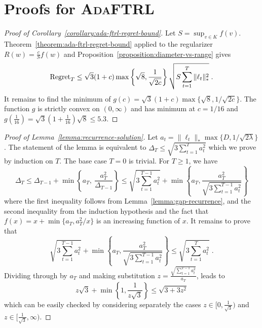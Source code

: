 \section{Proofs for \textsc{AdaFTRL}}
\label{section:ada-ftrl-proofs}

\begin{proof}[Proof of Corollary~\ref{corollary:ada-ftrl-regret-bound}]
Let $S = \sup_{v \in K} f(v)$. Theorem~\ref{theorem:ada-ftrl-regret-bound}
applied to the regularizer $R(w) = \frac{c}{S} f(w)$ and
Proposition~\ref{proposition:diameter-vs-range} gives
$$
\operatorname{Regret}_T \le \sqrt{3}(1 + c) \max\left\{\sqrt{8}, \frac{1}{\sqrt{2c}} \right\} \sqrt{S \sum_{t=1}^T \|\ell_t\|_*^2} \; .
$$
It remains to find the minimum of $g(c) = \sqrt{3}(1 + c) \max\{\sqrt{8},
1/\sqrt{2c}\}$.  The function $g$ is strictly convex on $(0, \infty)$ and has
minimum at $c=1/16$ and $g(\frac{1}{16}) = \sqrt{3}(1+\frac{1}{16})\sqrt{8} \le
5.3$.
\end{proof}

\begin{proof}[Proof of Lemma~\ref{lemma:recurrence-solution}]
Let $a_t = \|\ell_t\|_* \max\{D, 1/\sqrt{2\lambda}\}$. The statement of the
lemma is equivalent to $\Delta_T \le \sqrt{3 \sum_{t=1}^T a_t^2}$ which we
prove by induction on $T$.  The base case $T=0$ is trivial. For $T \ge 1$, we
have
$$
\Delta_T
\le \Delta_{T-1} + \min \left\{a_T, \ \frac{a_T^2}{\Delta_{T-1}} \right\}
\le \sqrt{3 \sum_{t=1}^{T-1} a_t^2} + \min \left\{ a_T, \frac{a_T^2}{\sqrt{3 \sum_{t=1}^{T-1} a_t^2}} \right\}
$$
where the first inequality follows from Lemma~\ref{lemma:gap-recurrence}, and
the second inequality from the induction hypothesis and the fact that $f(x) = x
+ \min\{a_T, a_T^2/x\}$ is an increasing function of $x$.  It remains to prove
that
$$
\sqrt{3 \sum_{t=1}^{T-1} a_t^2} + \min \left\{ a_T, \frac{a_T^2}{\sqrt{3 \sum_{t=1}^{T-1} a_t^2}} \right\}
\le  \sqrt{3 \sum_{t=1}^T a_t^2} \; .
$$
Dividing through by $a_T$ and making substitution $z=\frac{\sqrt{\sum_{t=1}^{T-1} a_t^2}}{a_T}$, leads to
$$
z\sqrt{3} + \min\left\{1,\frac{1}{z\sqrt{3}}\right\} \le \sqrt{3 + 3z^2}
$$
which can be easily checked by considering separately the cases $z \in
[0,\frac{1}{\sqrt{3}})$ and $z \in [\frac{1}{\sqrt{3}}, \infty)$.
\end{proof}


